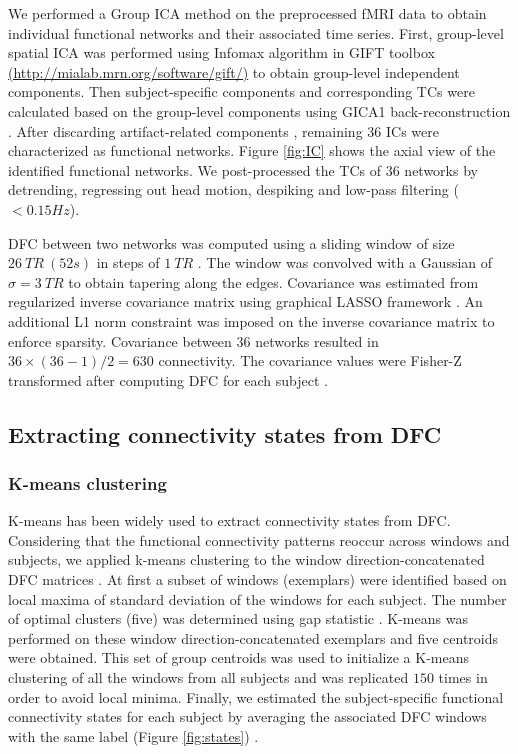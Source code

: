 \documentclass{article}
\begin{document}
We performed a Group \ac{ICA} method on the preprocessed \ac{fMRI} data to obtain individual functional networks and their associated time series. First, group-level spatial ICA was performed using Infomax algorithm \cite{bell_information-maximization_1995} in \acs{GIFT} toolbox \href{http://mialab.mrn.org/software/gift/}{(http://mialab.mrn.org/software/gift/)} to obtain group-level independent components. Then subject-specific components and corresponding \acp{TC} were calculated based on the group-level components using GICA1 back-reconstruction \cite{calhoun_spatial_2001}. After discarding artifact-related components \cite{allen_baseline_2011}, remaining $36$ \acp{IC} were characterized as functional networks. Figure \ref{fig:IC} shows the axial view of the identified functional networks. We post-processed the \acp{TC} of $36$ networks by detrending, regressing out head motion, despiking and low-pass filtering ($<0.15Hz$).

\ac{DFC} between two networks was computed using a sliding window of size $26\: TR\: (52s)$ in steps of $1\: TR$ \cite{allen_tracking_2014}. The window was convolved with a Gaussian of $\sigma = 3\: TR$ to obtain tapering along the edges. Covariance was estimated from regularized inverse covariance matrix \cite{smith_network_2011} \cite{varoquaux_brain_2010} using graphical LASSO framework \cite{friedman_sparse_2008}. An additional L1 norm constraint was imposed on the inverse covariance matrix to enforce sparsity. Covariance between $36$ networks resulted in $36\times(36-1)/2=630$ connectivity. The covariance values were Fisher-Z transformed after computing \ac{DFC} for each subject \cite{damaraju_dynamic_2014}.

\subsection{Extracting connectivity states from \acs{DFC}}
\label{sec:Clustering}

\subsubsection{K-means clustering}
\label{sec:K2}

K-means has been widely used to extract connectivity states from \ac{DFC}. Considering that the functional connectivity patterns reoccur across windows and subjects, we applied k-means clustering to the window direction-concatenated \ac{DFC} matrices \cite{damaraju_dynamic_2014}. At first a subset of windows (exemplars) were identified based on local maxima of standard deviation of the windows for each subject. The number of optimal clusters (five) was determined using gap statistic \cite{tibshirani_estimating_2001}. K-means was performed on these window direction-concatenated exemplars and five centroids were obtained. This set of group centroids was used to initialize a K-means clustering of all the windows from all subjects and was replicated $150$ times in order to avoid local minima. Finally, we estimated the subject-specific functional connectivity states for each subject by averaging the associated \ac{DFC} windows with the same label (Figure \ref{fig:states}) \cite{du_interaction_2016}.
\end{document}
